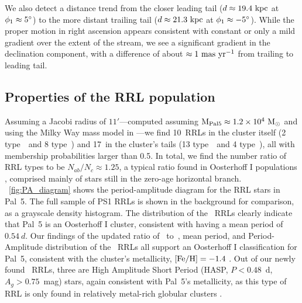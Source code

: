 \documentclass[twocolumn]{aastex63}
\newcommand{\sa}[1]{{\color{teal} SP: #1}}
\newcommand{\NRRcl}{10}     %
\newcommand{\NRRtails}{17} %
\begin{document}
We also detect a distance trend from the closer leading tail ($d \approx 19.4~\mathrm{kpc}$ at $\phi_1 \approx 5\mbox{$^\circ$}$) to the more distant trailing tail ($d \approx 21.3~\mathrm{kpc}$ at $\phi_1 \approx -5\mbox{$^\circ$}$).
While the proper motion in right ascension appears consistent with constant or only a mild gradient over the extent of the stream, we see a significant gradient in the declination component, with a difference of about $\approx 1~\mathrm{mas}~\mathrm{yr}^{-1}$ from trailing to leading tail.

\subsection{Properties of the RRL population}

Assuming a Jacobi radius of $11'$---computed assuming $\textrm{M}_{\rm Pal 5} \approx 1.2\times10^4~\mathrm{M}_\odot$ \citep{Kuepper:2015} and using the Milky Way mass model in \citet{gala}---we find \NRRcl\ RRLs in the cluster itself (2 type~\typeab\ and 8 type~\typec) and \NRRtails\ in the cluster's tails (13 type~\typeab\ and 4 type~\typec), all with membership probabilities larger than 0.5. In total, we find the number ratio of RRL types to be $N_{ab} / N_{c} \approx 1.25$, a typical ratio found in Oosterhoff I populations \citep{Smith:1995},  comprised mainly of stars still in the zero-age horizontal branch. \figurename~\ref{fig:PA_diagram} shows the period-amplitude diagram for the RRL stars in Pal~5. The full sample of PS1 RRLs is shown in the background for comparison, as a grayscale density histogram. The distribution of the \typeab~RRLs clearly indicate that Pal~5 is an Oosterhoff I cluster, consistent with having a mean period of $0.54~d$. Our findings of the updated ratio of \rrab~to~\rrc, mean period, and Period-Amplitude distribution of the \rrab\ RRLs all support an Oosterhoff I classification for Pal~5, consistent with the cluster's metallicity, $[\mathrm{Fe}/\mathrm{H}]=-1.4$ \citep{Dotter:2011}.
Out of our newly found \rrab\ RRLs, three are High Amplitude Short Period (HASP, $P <0.48$~d, $A_g>0.75$~mag) stars, again consistent with Pal~5's metallicity, as this type of RRL is only found in relatively metal-rich globular clusters  \citep[$\FeH>-1.5$;][]{Monelli:2017}.
\end{document}
